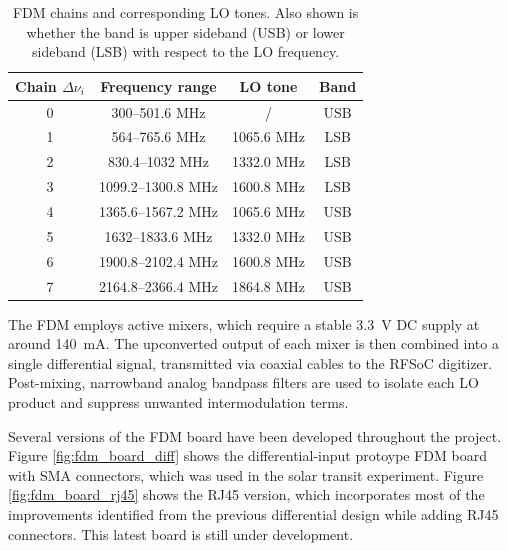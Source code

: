   \begin{table}[t]
  \centering
  \caption[FDM chains and corresponding LO tones]{FDM chains and corresponding LO tones. Also shown is whether the band is upper sideband (USB) or lower sideband (LSB) with respect to the LO frequency.}
   \begin{tabular}{cccc}
    \toprule
    \textbf{Chain $\Delta\nu_i$} & \textbf{Frequency range} & \textbf{LO tone} & \textbf{Band} \\
    \midrule
    0 & 300--501.6 MHz   & /            & USB \\
    1 & 564--765.6 MHz   & 1065.6 MHz   & LSB \\
    2 & 830.4--1032 MHz  & 1332.0 MHz   & LSB \\
    3 & 1099.2--1300.8 MHz & 1600.8 MHz & LSB \\
    4 & 1365.6--1567.2 MHz & 1065.6 MHz & USB \\
    5 & 1632--1833.6 MHz & 1332.0 MHz   & USB \\
    6 & 1900.8--2102.4 MHz & 1600.8 MHz & USB \\
    7 & 2164.8--2366.4 MHz & 1864.8 MHz & USB \\
    \bottomrule
    \end{tabular}
  
  \label{tab:fdm_lo_tones}
  \end{table}

The FDM employs active mixers, which require a stable \SI{3.3}{\volt} DC supply at around \SI{140}{\milli\ampere}. The upconverted output of each mixer is then combined into a single differential signal, transmitted via coaxial cables to the RFSoC digitizer. Post-mixing, narrowband analog bandpass filters are used to isolate each LO product and suppress unwanted intermodulation terms.

Several versions of the FDM board have been developed throughout the project. Figure \ref{fig:fdm_board_diff} shows the differential-input protoype FDM board with SMA connectors, which was used in the solar transit experiment. Figure \ref{fig:fdm_board_rj45} shows the RJ45 version, which incorporates most of the improvements identified from the previous differential design while adding RJ45 connectors. This latest board is still under development.

